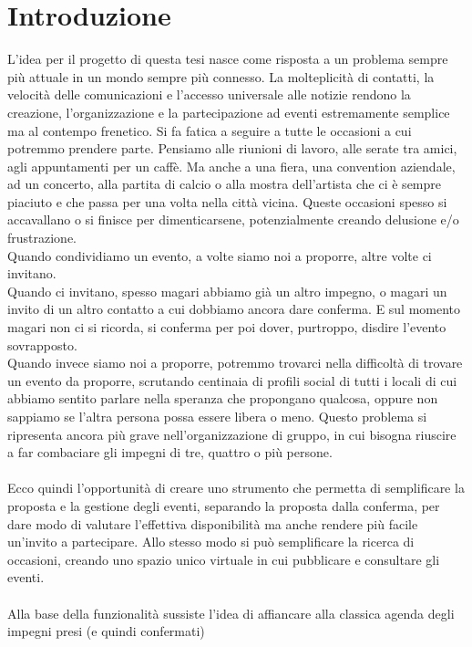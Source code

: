 \section{Introduzione}

L'idea per il progetto di questa tesi nasce come risposta a un problema sempre più attuale in un mondo sempre più connesso.
La molteplicità di contatti, la velocità delle comunicazioni e l'accesso universale alle notizie 
rendono la creazione, l'organizzazione e la partecipazione ad eventi estremamente semplice ma al contempo frenetico.
Si fa fatica a seguire a tutte le occasioni a cui potremmo prendere parte.
Pensiamo alle riunioni di lavoro, alle serate tra amici, agli appuntamenti per un caffè.
Ma anche a una fiera, una convention aziendale, ad un concerto, alla partita di calcio o alla mostra dell'artista che ci è sempre piaciuto e che passa per una volta nella città vicina.
Queste occasioni spesso si accavallano o si finisce per dimenticarsene, potenzialmente creando delusione e/o frustrazione.\\
\hfill \break
Quando condividiamo un evento, a volte siamo noi a proporre, altre volte ci invitano. \\
Quando ci invitano, spesso magari abbiamo già un altro impegno, o magari un invito di un altro contatto a cui dobbiamo ancora dare conferma. 
E sul momento magari non ci si ricorda, si conferma per poi dover, purtroppo, disdire l'evento sovrapposto.\\
Quando invece siamo noi a proporre, potremmo trovarci nella difficoltà di trovare un evento da proporre, 
scrutando centinaia di profili social di tutti i locali di cui abbiamo sentito parlare nella speranza che propongano qualcosa, 
oppure non sappiamo se l'altra persona possa essere libera o meno. 
Questo problema si ripresenta ancora più grave nell'organizzazione di gruppo, in cui bisogna riuscire a far combaciare gli impegni di tre, quattro o più persone.\\
\\
Ecco quindi l'opportunità di creare uno strumento che permetta di semplificare la proposta e la gestione degli eventi, 
separando la proposta dalla conferma, per dare modo di valutare l'effettiva disponibilità ma anche rendere più facile un'invito a partecipare.
Allo stesso modo si può semplificare la ricerca di occasioni, creando uno spazio unico virtuale in cui pubblicare e consultare gli eventi.\\
\\
Alla base della funzionalità sussiste l'idea di affiancare alla classica agenda degli impegni presi (e quindi confermati) 
